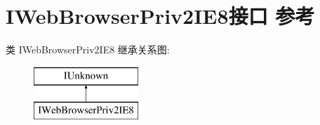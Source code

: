\hypertarget{interface_i_web_browser_priv2_i_e8}{}\section{I\+Web\+Browser\+Priv2\+I\+E8接口 参考}
\label{interface_i_web_browser_priv2_i_e8}
类 I\+Web\+Browser\+Priv2\+I\+E8 继承关系图\+:\begin{figure}[H]
\begin{center}
\leavevmode
\includegraphics[height=2.000000cm]{interface_i_web_browser_priv2_i_e8}
\end{center}
\end{figure}
